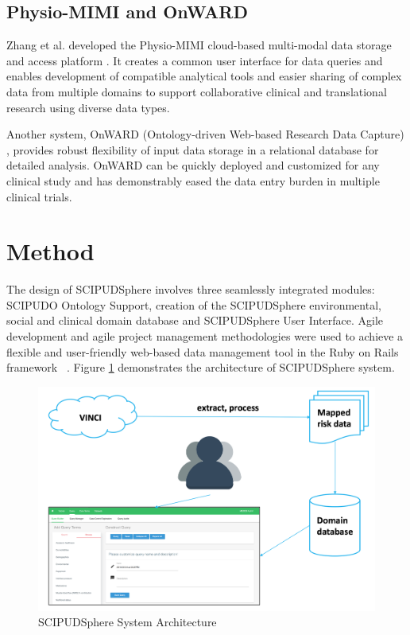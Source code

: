 \documentclass{amia}
\begin{document}
\subsection{Physio-MIMI and OnWARD}
Zhang et al. developed the Physio-MIMI cloud-based multi-modal data storage and access platform \cite{physiomimi}. It creates a common user interface for data queries and enables development of compatible analytical tools and easier sharing of complex data from multiple domains to support collaborative clinical and translational research using diverse data types. 

Another system, OnWARD (Ontology-driven Web-based Research Data Capture) \cite{onward}, provides robust flexibility of input data storage in a relational database for detailed analysis. OnWARD can be quickly deployed and customized for any clinical study and has demonstrably eased the data entry burden in multiple clinical trials. 

\section{Method}
The design of SCIPUDSphere involves three seamlessly integrated modules: SCIPUDO Ontology Support, creation of the SCIPUDSphere environmental, social and clinical domain database and SCIPUDSphere User Interface. Agile development and agile project management methodologies were used to achieve a flexible and user-friendly web-based data management tool in the Ruby on Rails framework ~\cite{ror}. Figure \ref{architecture} demonstrates the architecture of SCIPUDSphere system. 

\begin{figure}[h!]
  \centering
  \includegraphics[scale=0.4]{pics/architecture.png}
  \caption{SCIPUDSphere System Architecture}
  \label{architecture}
\end{figure}
\end{document}
